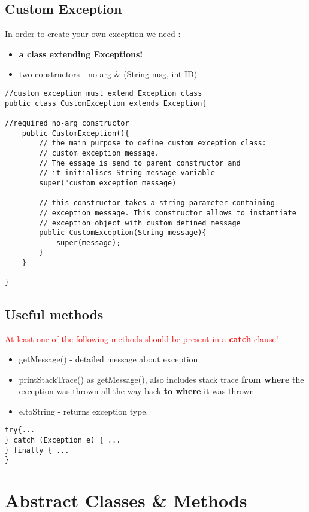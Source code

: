 \documentclass{report}
\begin{document}
\section{Custom Exception}
In order to create your own exception we need :
\begin{itemize}
	\item \textbf{a class extending Exceptions!}
	\item two constructors - no-arg \& (String msg, int ID)
\end{itemize}

\begin{verbatim}
//custom exception must extend Exception class
public class CustomException extends Exception{

//required no-arg constructor
    public CustomException(){
        // the main purpose to define custom exception class:
        // custom exception message.
        // The essage is send to parent constructor and 
        // it initialises String message variable
        super("custom exception message)
        
        // this constructor takes a string parameter containing 
        // exception message. This constructor allows to instantiate
        // exception object with custom defined message
        public CustomException(String message){
            super(message);
        }
    }

}
\end{verbatim}

\section{Useful methods}
\textcolor{red}{At least one of the following methods should be present in a \textbf{catch} clause!}
\begin{itemize}
	\item getMessage() - detailed message about exception
	\item printStackTrace() as getMessage(), also includes stack trace \textbf{from where} the exception was thrown all the way back \textbf{to where }it was thrown
	\item e.toString - returns exception type.
\end{itemize}

\begin{verbatim}
try{...
} catch (Exception e) { ...
} finally { ...
}
\end{verbatim}

\chapter{Abstract Classes \& Methods}
\end{document}
